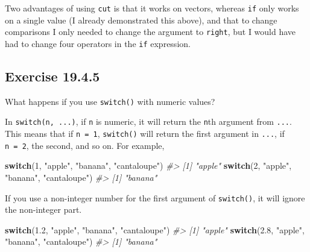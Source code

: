 \documentclass[]{book}
\newenvironment{Shaded}{\begin{snugshade}}{\end{snugshade}}
\newcommand{\CommentTok}[1]{\textcolor[rgb]{0.56,0.35,0.01}{\textit{#1}}}
\newcommand{\ControlFlowTok}[1]{\textcolor[rgb]{0.13,0.29,0.53}{\textbf{#1}}}
\newcommand{\DecValTok}[1]{\textcolor[rgb]{0.00,0.00,0.81}{#1}}
\newcommand{\FloatTok}[1]{\textcolor[rgb]{0.00,0.00,0.81}{#1}}
\newcommand{\NormalTok}[1]{#1}
\newcommand{\StringTok}[1]{\textcolor[rgb]{0.31,0.60,0.02}{#1}}
\theoremstyle{plain}
\theoremstyle{remark}
\theoremstyle{definition}
\theoremstyle{definition}
\theoremstyle{definition}
\theoremstyle{remark}
\begin{document}
Two advantages of using \texttt{cut} is that it works on vectors,
whereas \texttt{if} only works on a single value (I already demonstrated
this above), and that to change comparisons I only needed to change the
argument to \texttt{right}, but I would have had to change four
operators in the \texttt{if} expression.

\hypertarget{exercise-19.4.5}{%
\subsection*{\texorpdfstring{Exercise
{19.4.5}}{Exercise 19.4.5}}\label{exercise-19.4.5}}

What happens if you use \texttt{switch()} with numeric values?

In \texttt{switch(n,\ ...)}, if \texttt{n} is numeric, it will return
the \texttt{n}th argument from \texttt{...}. This means that if
\texttt{n\ =\ 1}, \texttt{switch()} will return the first argument in
\texttt{...}, if \texttt{n\ =\ 2}, the second, and so on. For example,

\begin{Shaded}
\begin{Highlighting}[]
\ControlFlowTok{switch}\NormalTok{(}\DecValTok{1}\NormalTok{, }\StringTok{"apple"}\NormalTok{, }\StringTok{"banana"}\NormalTok{, }\StringTok{"cantaloupe"}\NormalTok{)}
\CommentTok{#> [1] "apple"}
\ControlFlowTok{switch}\NormalTok{(}\DecValTok{2}\NormalTok{, }\StringTok{"apple"}\NormalTok{, }\StringTok{"banana"}\NormalTok{, }\StringTok{"cantaloupe"}\NormalTok{)}
\CommentTok{#> [1] "banana"}
\end{Highlighting}
\end{Shaded}

If you use a non-integer number for the first argument of
\texttt{switch()}, it will ignore the non-integer part.

\begin{Shaded}
\begin{Highlighting}[]
\ControlFlowTok{switch}\NormalTok{(}\FloatTok{1.2}\NormalTok{, }\StringTok{"apple"}\NormalTok{, }\StringTok{"banana"}\NormalTok{, }\StringTok{"cantaloupe"}\NormalTok{)}
\CommentTok{#> [1] "apple"}
\ControlFlowTok{switch}\NormalTok{(}\FloatTok{2.8}\NormalTok{, }\StringTok{"apple"}\NormalTok{, }\StringTok{"banana"}\NormalTok{, }\StringTok{"cantaloupe"}\NormalTok{)}
\CommentTok{#> [1] "banana"}
\end{Highlighting}
\end{Shaded}
\end{document}
